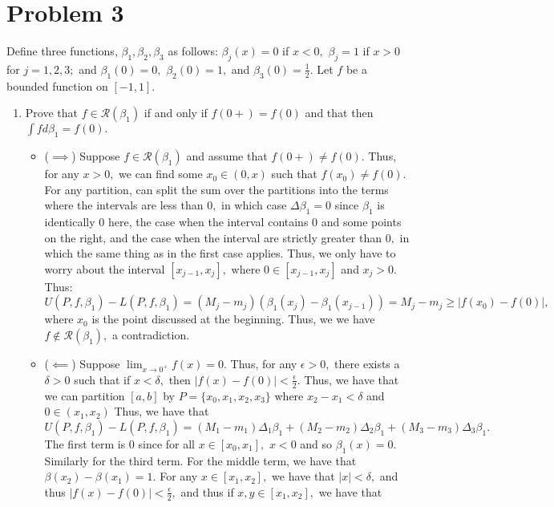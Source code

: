 \documentclass[11pt]{article}
\begin{document}
\newpage
\section*{Problem 3}
\begin{problem}
    Define three functions, $\beta_1, \beta_2, \beta_3$ as follows: $\beta_j(x) = 0$ if $x<0,$ $\beta_j = 1$ if $x>0$ for $j = 1,2,3;$ and $\beta_1(0) = 0,$ $\beta_2(0) = 1,$ and $\beta_3(0) = \frac{1}{2}.$ Let $f$ be a bounded function on $[-1,1].$ 
\end{problem}
\begin{enumerate}
    \item 
    \begin{problem}
        Prove that $f\in \mathcal{R}(\beta_1)$ if and only if $f(0 + ) = f(0)$ and that then $\int f d\beta_1 = f(0).$
    \end{problem}
    \begin{solution}
        \begin{itemize}
            \item ($\implies$) Suppose $f\in \mathcal{R}(\beta_1)$ and assume that $f(0+)\neq f(0).$ Thus, for any $x>0,$ we can find some $x_0 \in (0,x)$ such that $f(x_0)\neq f(0).$ For any partition, can split the sum over the partitions into the terms where the intervals are less than $0,$ in which case $\Delta \beta_1 = 0$ since $\beta_1$ is identically $0$ here, the case when the interval contains $0$ and some points on the right, and the case when the interval are strictly greater than $0,$ in which the same thing as in the first case applies. Thus, we only have to worry about the interval $[x_{j-1}, x_j],$ where $0 \in [x_{j-1}, x_j]$ and $x_j > 0.$ Thus:
            \[U(P, f, \beta_1) - L(P, f, \beta_1) =  (M_j  - m_j)(\beta_1(x_j) - \beta_1(x_{j-1})) = M_j - m_j \geq |f(x_0)- f(0)|,\] where $x_0$ is the point discussed at the beginning. Thus, we we have $f\notin \mathcal{R}(\beta_1),$ a contradiction.
            \item ($\impliedby$) Suppose $\lim_{x\to 0^+}f(x) = 0.$ Thus, for any $\epsilon>0,$ there exists a $\delta>0$ such that if $x<\delta,$ then $|f(x) - f(0)|< \frac{\epsilon}{2}.$ Thus, we have that we can partition $[a,b]$ by $P = \{x_0,x_1, x_2, x_3\}$ where $x_2 - x_1 < \delta$ and $0 \in (x_1,x_2)$ Thus, we have that
            \[U(P, f, \beta_1) - L(P, f, \beta_1) = (M_1 - m_1)\Delta_1 \beta_1 + (M_2- m_2)\Delta_2 \beta_1 + (M_3 - m_3)\Delta_3\beta_1.\] The first term is $0$ since for all $x\in [x_0, x_1],$ $x<0$ and so $\beta_1(x) = 0.$ Similarly for the third term. For the middle term, we have that $\beta(x_2) - \beta(x_1) = 1.$ For any $x\in [x_1, x_2],$ we have that $|x|< \delta,$ and thus $|f(x) - f(0)| < \frac{\epsilon}{2},$ and thus if $x,y \in [x_1, x_2],$ we have that 

\end{itemize}
\end{solution}
\end{enumerate}
\end{document}
